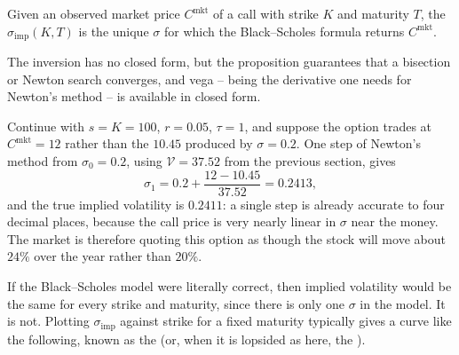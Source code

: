 \begin{definition}
	Given an observed market price $C^{\mathrm{mkt}}$ of a call with strike $K$ and maturity $T$, the  $\sigma_{\mathrm{imp}}(K,T)$ is the unique $\sigma$ for which the Black--Scholes formula returns $C^{\mathrm{mkt}}$.
\end{definition}

The inversion has no closed form, but the proposition guarantees that a bisection or Newton search converges, and vega -- being the derivative one needs for Newton's method -- is available in closed form.

\begin{example}
	Continue with $s = K = 100$, $r = 0.05$, $\tau = 1$, and suppose the option trades at $C^{\mathrm{mkt}} = 12$ rather than the $10.45$ produced by $\sigma = 0.2$. One step of Newton's method from $\sigma_0 = 0.2$, using $\mathcal{V} = 37.52$ from the previous section, gives
	$$
	\sigma_1 = 0.2 + \frac{12 - 10.45}{37.52} = 0.2413,
	$$
	and the true implied volatility is $0.2411$: a single step is already accurate to four decimal places, because the call price is very nearly linear in $\sigma$ near the money. The market is therefore quoting this option as though the stock will move about $24\%$ over the year rather than $20\%$.
\end{example}

If the Black--Scholes model were literally correct, then implied volatility would be the same for every strike and maturity, since there is only one $\sigma$ in the model. It is not. Plotting $\sigma_{\mathrm{imp}}$ against strike for a fixed maturity typically gives a curve like the following, known as the  (or, when it is lopsided as here, the ).

